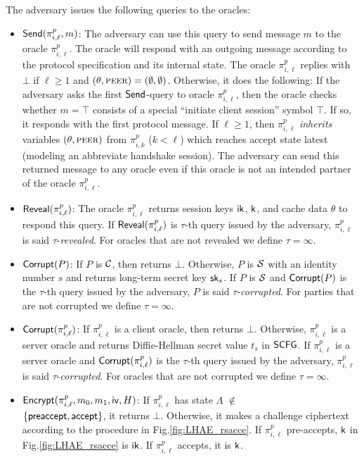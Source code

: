 The adversary issues the following queries to the
oracles:
\begin{itemize}
 \item {$\mathsf{Send}(\pi^p_{i, \ell}, m)$:
 The adversary can use this query to send message
 $m$ to the oracle $\pi^p_{i, \ell}$.
 The oracle will respond with an outgoing message
 according to the protocol specification and its
 internal state.
 The oracle $\pi^p_{i, \ell}$ replies with $\bot$
 if $\ell \geq 1$ and
 $(\theta,\textsc{peer}) = (\emptyset, \emptyset)$.
 Otherwise, it does the following: If the adversary
 asks the first $\mathsf{Send}$-query to oracle
 $\pi^p_{i, \ell}$, then the oracle checks whether
 $m = \top$ consists of a special
 ``initiate client session'' symbol $\top$.
 If so, it responds with the first protocol message.
 If $\ell \geq 1$,
 then $\pi^p_{i,\ell}$ \textit{inherits} variables $(\theta,\textsc{peer})$ from
 $\pi^p_{i, k}$ ($k < \ell$) which reaches accept state latest
 (modeling an abbreviate handshake session).
 The adversary can send this returned message to any
 oracle even if this oracle is not an intended partner of
 the oracle $\pi^p_{i, \ell}$.}

 \item {$\mathsf{Reveal}(\pi^p_{i,\ell})$:
 The oracle $\pi^p_{i,\ell}$ returns session keys
 $\mathsf{ik}$, $\mathsf{k}$, and cache data $\theta$ to respond this query.
 If $\mathsf{Reveal}(\pi^p_{i,\ell})$ is $\tau$-th query issued by the adversary,
 $\pi^p_{i,\ell}$ is said $\tau$-\textit{revealed}.
 For oracles that are not revealed we define
 $\tau = \infty$.}

 \item {$\mathsf{Corrupt}(P)$:
 If $P$ is $\mathcal{C}$, then returns $\bot$.
 Otherwise, $P$ is $\mathcal{S}$ with an identity number $s$ and returns long-term
 secret key $\mathsf{sk}_s$.
 If $P$ is $\mathcal{S}$ and $\mathsf{Corrupt}(P)$ is the
 $\tau$-th query issued by the adversary, $P$ is said
 $\tau$-\textit{corrupted}.
 For parties that are not corrupted we define
 $\tau = \infty$.}

\item {$\mathsf{Corrupt}(\pi^p_{i,\ell})$:
 If $\pi^p_{i,\ell}$ is a client oracle, then returns $\bot$.
 Otherwise, $\pi^p_{i,\ell}$ is a server oracle and returns
 Diffie-Hellman secret value $t_s$ in $\mathsf{SCFG}$.
 If $\pi^p_{i,\ell}$ is a server oracle and $\mathsf{Corrupt}(\pi^p_{i,\ell})$ is the
 $\tau$-th query issued by the adversary, $\pi^p_{i,\ell}$ is said
 $\tau$-\textit{corrupted}.
 For oracles that are not corrupted we define
 $\tau = \infty$.}

 \item {$\mathsf{Encrypt}(\pi^p_{i,\ell}, m_0, m_1, \mathsf{iv}, H)$:
 If $\pi^p_{i,\ell}$ has state
 $\Lambda$ $\not\in$ \\ $\{\mathsf{preaccept}, \mathsf{accept}\}$,
 it returns $\bot$.
 Otherwise, it makes a challenge ciphertext according to
 the procedure in Fig.\ref{fig:LHAE_rsacce}. If $\pi^p_{i,\ell}$ pre-accepts,
 $\mathsf{k}$ in Fig.\ref{fig:LHAE_rsacce} is $\mathsf{ik}$. If $\pi^p_{i,\ell}$ accepts, it is $\mathsf{k}$.}


\end{itemize}
